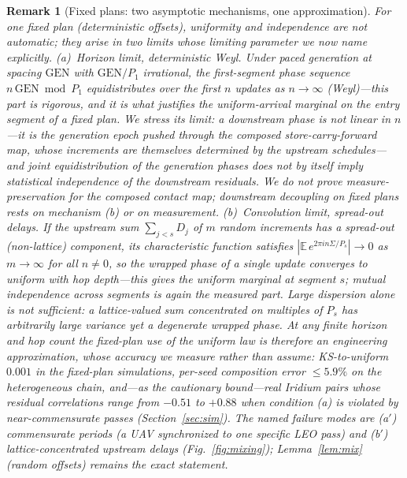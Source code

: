 \documentclass[twocolumn,3p,times,procedia]{elsarticle}
\newtheorem{remark}{Remark}
\newcommand{\E}{\mathbb{E}}
\newcommand{\GEN}{\mathrm{GEN}}
\begin{document}
\begin{remark}[Fixed plans: two asymptotic mechanisms, one
approximation]\label{rem:fixedmix}
For one \emph{fixed} plan (deterministic offsets), uniformity and
independence are not automatic; they arise in two limits whose limiting
parameter we now name explicitly.
(a)~\emph{Horizon limit, deterministic Weyl.} Under paced generation at
spacing $\GEN$ with $\GEN/P_1$ irrational, the \emph{first-segment}
phase sequence $n\,\GEN\bmod P_1$ equidistributes over the first $n$
updates as $n\to\infty$ (Weyl)---this part is rigorous, and it is what
justifies the uniform-arrival marginal on the entry segment of a fixed
plan. We stress its limit: a \emph{downstream} phase is not linear in
$n$---it is the generation epoch pushed through the composed
store-carry-forward map, whose increments are themselves determined by
the upstream schedules---and joint equidistribution of the
\emph{generation} phases does not by itself imply statistical
independence of the downstream residuals. We do not prove
measure-preservation for the composed contact map; downstream
decoupling on fixed plans rests on mechanism (b) or on measurement.
(b)~\emph{Convolution limit, spread-out delays.} If the upstream sum
$\sum_{j<s}D_j$ of $m$ random increments has a spread-out (non-lattice)
component, its characteristic function satisfies
$|\E\,e^{2\pi i n\Sigma/P_s}|\to0$ as $m\to\infty$ for all $n\ne0$, so
the wrapped phase of a \emph{single} update converges to uniform with
hop depth---this gives the uniform \emph{marginal} at segment $s$;
mutual independence across segments is again the measured part. Large
dispersion \emph{alone} is not sufficient: a
lattice-valued sum concentrated on multiples of $P_s$ has arbitrarily
large variance yet a degenerate wrapped phase.
At any finite horizon and hop count the fixed-plan use of the uniform
law is therefore an \emph{engineering approximation}, whose accuracy we
measure rather than assume: KS-to-uniform $0.001$ in the fixed-plan
simulations, per-seed composition error $\le5.9\%$ on the heterogeneous
chain, and---as the cautionary bound---real Iridium pairs whose
residual correlations range from $-0.51$ to $+0.88$ when condition (a)
is violated by near-commensurate passes
(Section~\ref{sec:sim}). The named failure modes are (a$'$)
commensurate periods (a UAV synchronized to one specific LEO pass) and
(b$'$) lattice-concentrated upstream delays
(Fig.~\ref{fig:mixing}); Lemma~\ref{lem:mix} (random offsets) remains
the exact statement.
\end{remark}
\end{document}
